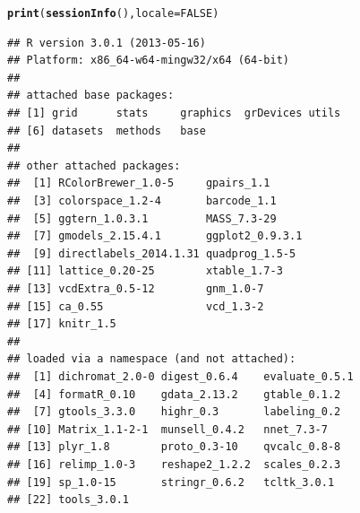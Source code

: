 \documentclass[11pt]{book}\usepackage[]{graphicx}\usepackage[]{color}
\makeatletter
\newcommand{\hlnum}[1]{\textcolor[rgb]{0.686,0.059,0.569}{#1}}%
\newcommand{\hlstd}[1]{\textcolor[rgb]{0.345,0.345,0.345}{#1}}%
\newcommand{\hlkwc}[1]{\textcolor[rgb]{0.333,0.667,0.333}{#1}}%
\newcommand{\hlkwd}[1]{\textcolor[rgb]{0.737,0.353,0.396}{\textbf{#1}}}%
\newenvironment{kframe}{%
 \def\at@end@of@kframe{}%
 \ifinner\ifhmode%
  \def\at@end@of@kframe{\end{minipage}}%
  \begin{minipage}{\columnwidth}%
 \fi\fi%
 \def\FrameCommand##1{\hskip\@totalleftmargin \hskip-\fboxsep
 \colorbox{shadecolor}{##1}\hskip-\fboxsep
     \hskip-\linewidth \hskip-\@totalleftmargin \hskip\columnwidth}%
 \MakeFramed {\advance\hsize-\width
   \@totalleftmargin\z@ \linewidth\hsize
   \@setminipage}}%
 {\par\unskip\endMakeFramed%
 \at@end@of@kframe}
\newenvironment{knitrout}{}{} %
\renewenvironment{knitrout}{\small\renewcommand{\baselinestretch}{.85}}{} %
\makeatother
\begin{document}
\begin{knitrout}
\color{fgcolor}\begin{kframe}
\begin{alltt}
\hlkwd{print}\hlstd{(}\hlkwd{sessionInfo}\hlstd{(),} \hlkwc{locale} \hlstd{=} \hlnum{FALSE}\hlstd{)}
\end{alltt}
\begin{verbatim}
## R version 3.0.1 (2013-05-16)
## Platform: x86_64-w64-mingw32/x64 (64-bit)
## 
## attached base packages:
## [1] grid      stats     graphics  grDevices utils    
## [6] datasets  methods   base     
## 
## other attached packages:
##  [1] RColorBrewer_1.0-5     gpairs_1.1            
##  [3] colorspace_1.2-4       barcode_1.1           
##  [5] ggtern_1.0.3.1         MASS_7.3-29           
##  [7] gmodels_2.15.4.1       ggplot2_0.9.3.1       
##  [9] directlabels_2014.1.31 quadprog_1.5-5        
## [11] lattice_0.20-25        xtable_1.7-3          
## [13] vcdExtra_0.5-12        gnm_1.0-7             
## [15] ca_0.55                vcd_1.3-2             
## [17] knitr_1.5             
## 
## loaded via a namespace (and not attached):
##  [1] dichromat_2.0-0 digest_0.6.4    evaluate_0.5.1 
##  [4] formatR_0.10    gdata_2.13.2    gtable_0.1.2   
##  [7] gtools_3.3.0    highr_0.3       labeling_0.2   
## [10] Matrix_1.1-2-1  munsell_0.4.2   nnet_7.3-7     
## [13] plyr_1.8        proto_0.3-10    qvcalc_0.8-8   
## [16] relimp_1.0-3    reshape2_1.2.2  scales_0.2.3   
## [19] sp_1.0-15       stringr_0.6.2   tcltk_3.0.1    
## [22] tools_3.0.1
\end{verbatim}
\end{kframe}
\end{knitrout}


	
\end{document}
